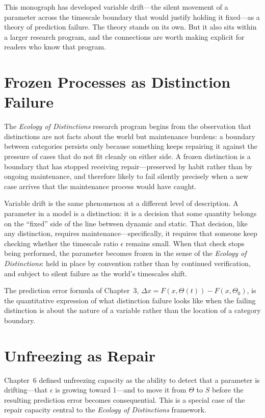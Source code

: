 \documentclass[11pt]{book}
\theoremstyle{plain}
\theoremstyle{definition}
\theoremstyle{remark}
\begin{document}
This monograph has developed variable drift---the silent movement of a parameter across the timescale boundary that would justify holding it fixed---as a theory of prediction failure. The theory stands on its own. But it also sits within a larger research program, and the connections are worth making explicit for readers who know that program.

\section*{Frozen Processes as Distinction Failure}

The \emph{Ecology of Distinctions} research program begins from the observation that distinctions are not facts about the world but maintenance burdens: a boundary between categories persists only because something keeps repairing it against the pressure of cases that do not fit cleanly on either side. A frozen distinction is a boundary that has stopped receiving repair---preserved by habit rather than by ongoing maintenance, and therefore likely to fail silently precisely when a new case arrives that the maintenance process would have caught.

Variable drift is the same phenomenon at a different level of description. A parameter in a model is a distinction: it is a decision that some quantity belongs on the ``fixed'' side of the line between dynamic and static. That decision, like any distinction, requires maintenance---specifically, it requires that someone keep checking whether the timescale ratio $\epsilon$ remains small. When that check stops being performed, the parameter becomes frozen in the sense of the \emph{Ecology of Distinctions}: held in place by convention rather than by continued verification, and subject to silent failure as the world's timescales shift.

The prediction error formula of Chapter~3, $\Delta x = F(x,\Theta(t)) - F(x,\Theta_0)$, is the quantitative expression of what distinction failure looks like when the failing distinction is about the nature of a variable rather than the location of a category boundary.

\section*{Unfreezing as Repair}

Chapter~6 defined unfreezing capacity as the ability to detect that a parameter is drifting---that $\epsilon$ is growing toward 1---and to move it from $\Theta$ to $S$ before the resulting prediction error becomes consequential. This is a special case of the repair capacity central to the \emph{Ecology of Distinctions} framework.
\end{document}
